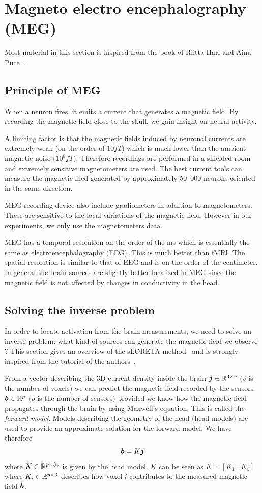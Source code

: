 \section{Magneto electro encephalography (MEG)}
Most material in this section is inspired from the book of Riitta Hari and Aina
Puce~\cite{hari2017meg}.

\subsection{Principle of MEG}
When a neuron fires, it emits a current that generates a magnetic field. By
recording the magnetic field close to the skull, we gain insight on neural
activity.

A limiting factor is that the magnetic fields induced by neuronal currents are
extremely weak (on the order of $10 fT$) which is much lower than the ambient magnetic noise ($10^8 fT$). Therefore recordings are performed in a shielded room and extremely sensitive magnetometers are used.
The best current tools can measure the magnetic filed generated by approximately 50~000 neurons oriented in the same direction.

MEG recording device also include gradiometers in addition to magnetometers.
These are sensitive to the local variations of the magnetic field. However in our experiments, we only use the magnetometers data.

MEG has a temporal resolution on the order of the ms which is essentially the same as electroencephalography (EEG). This is much better than fMRI. The spatial
resolution is similar to that of EEG and is on the order of the centimeter.
In general the brain sources are slightly better localized in MEG since the
magnetic field is not affected by changes in conductivity in the head.


\subsection{Solving the inverse problem}
In order to locate activation from the brain measurements, we need to solve an inverse problem: what kind of sources can generate the magnetic field we
observe ? This section gives an overview of the sLORETA
method~\cite{pascual2002standardized} and is strongly inspired from the tutorial
of the authors~\cite{pascual2007discrete}.

From a vector describing the 3D current density inside the brain $\boldsymbol{j} \in \mathbb{R}^{3 \times v}$
($v$ is the number of voxels) we
can predict the magnetic field recorded by the sensors $\boldsymbol{b} \in \mathbb{R}^p$ ($p$ is the number of sensors) provided
we know how the magnetic field propagates through the brain by using Maxwell's
equation. This is called the \emph{forward model}. Models describing the
geometry of the head (head models) are used to provide an approximate solution for the forward model.
We have therefore
\begin{align}
  \boldsymbol{b} = K \boldsymbol{j}
  \label{eq:maxwell}
\end{align}
where $K \in \mathbb{R}^{p \times 3v}$ is given by the head model.
$K$ can be seen as $K  = [K_1 \dots K_{v}]$ where $K_i \in \mathbb{R}^{p \times 3}$ describes how voxel $i$ contributes to the measured magnetic field $\boldsymbol{b}$.


